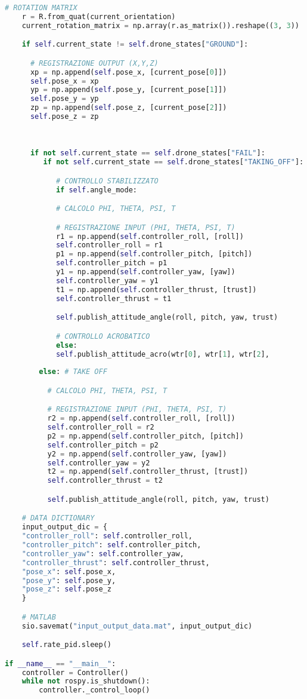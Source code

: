 \begin{lstlisting}[language=Python, numbers=none]
    # ROTATION MATRIX
    r = R.from_quat(current_orientation)
    current_rotation_matrix = np.array(r.as_matrix()).reshape((3, 3))

    if self.current_state != self.drone_states["GROUND"]:

      # REGISTRAZIONE OUTPUT (X,Y,Z)
      xp = np.append(self.pose_x, [current_pose[0]])
      self.pose_x = xp
      yp = np.append(self.pose_y, [current_pose[1]])
      self.pose_y = yp
      zp = np.append(self.pose_z, [current_pose[2]])
      self.pose_z = zp
      
      

      if not self.current_state == self.drone_states["FAIL"]:
         if not self.current_state == self.drone_states["TAKING_OFF"]:

            # CONTROLLO STABILIZZATO
            if self.angle_mode:

            # CALCOLO PHI, THETA, PSI, T

            # REGISTRAZIONE INPUT (PHI, THETA, PSI, T)
            r1 = np.append(self.controller_roll, [roll])
            self.controller_roll = r1
            p1 = np.append(self.controller_pitch, [pitch])
            self.controller_pitch = p1
            y1 = np.append(self.controller_yaw, [yaw])
            self.controller_yaw = y1
            t1 = np.append(self.controller_thrust, [trust])
            self.controller_thrust = t1

            self.publish_attitude_angle(roll, pitch, yaw, trust)

            # CONTROLLO ACROBATICO    
            else:
            self.publish_attitude_acro(wtr[0], wtr[1], wtr[2],
                    
        else: # TAKE OFF

          # CALCOLO PHI, THETA, PSI, T

          # REGISTRAZIONE INPUT (PHI, THETA, PSI, T)
          r2 = np.append(self.controller_roll, [roll])
          self.controller_roll = r2
          p2 = np.append(self.controller_pitch, [pitch])
          self.controller_pitch = p2
          y2 = np.append(self.controller_yaw, [yaw])
          self.controller_yaw = y2
          t2 = np.append(self.controller_thrust, [trust])
          self.controller_thrust = t2

          self.publish_attitude_angle(roll, pitch, yaw, trust)

    # DATA DICTIONARY        
    input_output_dic = {
    "controller_roll": self.controller_roll,
    "controller_pitch": self.controller_pitch,
    "controller_yaw": self.controller_yaw,
    "controller_thrust": self.controller_thrust,
    "pose_x": self.pose_x,
    "pose_y": self.pose_y,
    "pose_z": self.pose_z
    }

    # MATLAB
    sio.savemat("input_output_data.mat", input_output_dic)

    self.rate_pid.sleep()

if __name__ == "__main__":
    controller = Controller()
    while not rospy.is_shutdown():
        controller._control_loop()
\end{lstlisting}
